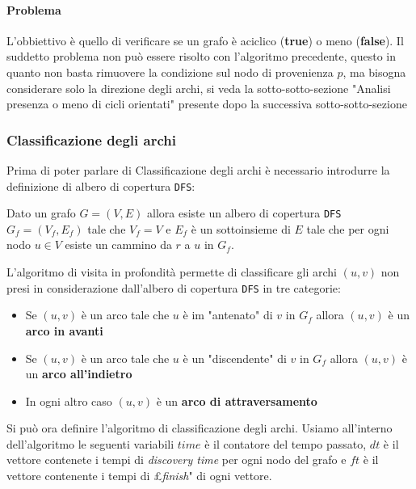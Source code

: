             \paragraph{Problema} L'obbiettivo è quello di verificare se un grafo è aciclico (\textbf{true}) o meno (\textbf{false}).\newline
                Il suddetto problema non può essere risolto con l'algoritmo precedente, questo in quanto non basta rimuovere la condizione sul nodo di provenienza $p$, ma bisogna considerare solo la direzione degli archi, si veda la sotto-sotto-sezione "Analisi presenza o meno di cicli orientati" presente dopo la successiva sotto-sotto-sezione
        \subsubsection{Classificazione degli archi}
            Prima di poter parlare di Classificazione degli archi è necessario introdurre la definizione di albero di copertura \texttt{DFS}:
            \begin{definition}
                Dato un grafo $G=(V,E)$ allora esiste un albero di copertura \texttt{DFS} $G_f=(V_f,E_f)$ tale che $V_f=V$ e $E_f$ è un sottoinsieme di $E$ tale che per ogni nodo $u\in V$ esiste un cammino da $r$ a $u$ in $G_f$.
            \end{definition}
            L'algoritmo di visita in profondità permette di classificare gli archi $(u,v)$ non presi in considerazione dall'albero di copertura \texttt{DFS} in tre categorie:
            \begin{itemize}
                \item Se $(u,v)$ è un arco tale che $u$ è im "antenato" di $v$ in $G_f$ allora $(u,v)$ è un \textbf{arco in avanti}
                \item Se $(u,v)$ è un arco tale che $u$ è un "discendente" di $v$ in $G_f$ allora $(u,v)$ è un \textbf{arco all'indietro}
                \item In ogni altro caso $(u,v)$ è un \textbf{arco di attraversamento}
            \end{itemize}
        Si può ora definire l'algoritmo di classificazione degli archi. Usiamo all'interno dell'algoritmo le seguenti variabili $time$ è il contatore del tempo passato, $dt$ è il vettore contenete i tempi di \textit{discovery time} per ogni nodo del grafo e $ft$ è il vettore contenente i tempi di £\textit{finish}" di ogni vettore.

